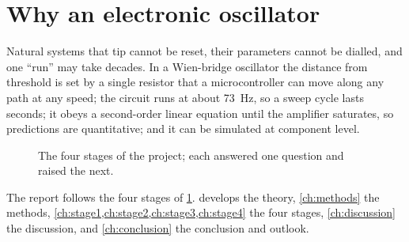 \section{Why an electronic oscillator}\label{sec:outline}

Natural systems that tip cannot be reset, their parameters cannot be dialled, and one ``run'' may take
decades. In a Wien-bridge oscillator the distance from threshold is set by a single resistor that a
microcontroller can move along any path at any speed; the circuit runs at about \SI{73}{\hertz}, so a
sweep cycle lasts seconds; it obeys a second-order linear equation until the amplifier saturates, so
predictions are quantitative; and it can be simulated at component level.

\begin{figure}[!htb]
\centering
{}
\caption[The four stages of the project]{The four stages of the project; each answered one question and
raised the next.}
\label{fig:roadmap}
\end{figure}

The report follows the four stages of \cref{fig:roadmap}.  develops the theory,
\cref{ch:methods} the methods, \cref{ch:stage1,ch:stage2,ch:stage3,ch:stage4} the four stages,
\cref{ch:discussion} the discussion, and \cref{ch:conclusion} the conclusion and outlook.
